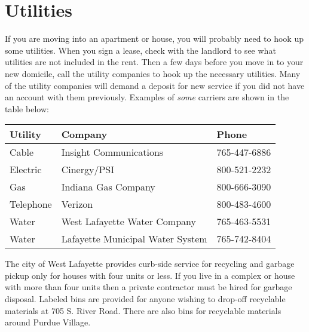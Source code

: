 \section{Utilities}

If you are moving into an apartment or house, you will probably need to hook up some utilities. When you sign a lease, check with the landlord to see what utilities are not included in the rent. Then a few days before you move in to your new domicile, call the utility companies to hook up the necessary utilities. Many of the utility companies will demand a deposit for new service if you did not have an account with them previously. Examples of \emph{some} carriers are shown in the table below:

\begin{table}[h]
	\centering

	\begin{tabular}{@{}lll@{}}
		\toprule
		\textbf{Utility} & \textbf{Company} & \textbf{Phone} \\
		\midrule

		Cable & Insight Communications & 765-447-6886 \\
		Electric & Cinergy/PSI & 800-521-2232 \\
		Gas & Indiana Gas Company & 800-666-3090 \\
		Telephone & Verizon & 800-483-4600 \\
		Water & West Lafayette Water Company & 765-463-5531 \\
		Water & Lafayette Municipal Water System & 765-742-8404 \\

		\bottomrule
	\end{tabular}

\end{table}


The city of West Lafayette provides curb-side service for recycling and garbage pickup only for houses with four units or less. If you live in a complex or house with more than four units then a private contractor must be hired for garbage disposal. Labeled bins are provided for anyone wishing to drop-off recyclable materials at 705 S. River Road. There are also bins for recyclable materials around Purdue Village.
